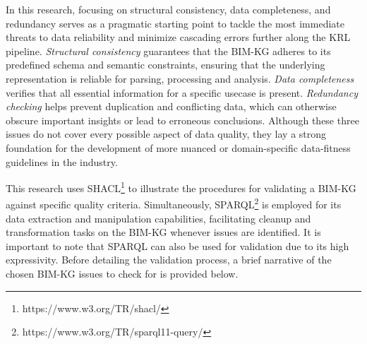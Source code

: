 In this research, focusing on structural consistency, data completeness, and redundancy serves as a pragmatic starting point to tackle the most immediate threats to data reliability and minimize cascading errors further along the KRL pipeline. \textit{Structural consistency} guarantees that the \ac{BIM-KG} adheres to its predefined schema and semantic constraints, ensuring that the underlying representation is reliable for parsing, processing and analysis. \textit{Data completeness} verifies that all essential information for a specific usecase is present. \textit{Redundancy checking} helps prevent duplication and conflicting data, which can otherwise obscure important insights or lead to erroneous conclusions. Although these three issues do not cover every possible aspect of data quality, they lay a strong foundation for the development of more nuanced or domain-specific data-fitness guidelines in the industry.

This research uses \ac{SHACL}\footnote{https://www.w3.org/TR/shacl/} to illustrate the procedures for validating a \ac{BIM-KG} against specific quality criteria. Simultaneously, \ac{SPARQL}\footnote{https://www.w3.org/TR/sparql11-query/} is employed for its data extraction and manipulation capabilities, facilitating cleanup and transformation tasks on the \ac{BIM-KG} whenever issues are identified. It is important to note that SPARQL can also be used for validation due to its high expressivity. Before detailing the validation process, a brief narrative of the chosen \ac{BIM-KG} issues to check for is provided below. 

